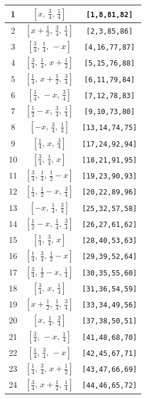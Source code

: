 \documentclass[fleqn,8pt]{jsarticle}
\begin{document}
\begin{longtable}{ccc}
1 & $\left[ x,\, \frac{3}{4},\, \frac{1}{4} \right]$ & {\tt [1,8,81,82]} \\ \hline
2 & $\left[ x + \frac{1}{2},\, \frac{3}{4},\, \frac{1}{4} \right]$ & {\tt [2,3,85,86]} \\ \hline
3 & $\left[ \frac{3}{4},\, \frac{1}{4},\, - x \right]$ & {\tt [4,16,77,87]} \\ \hline
4 & $\left[ \frac{3}{4},\, \frac{1}{4},\, x + \frac{1}{2} \right]$ & {\tt [5,15,76,88]} \\ \hline
5 & $\left[ \frac{1}{4},\, x + \frac{1}{2},\, \frac{3}{4} \right]$ & {\tt [6,11,79,84]} \\ \hline
6 & $\left[ \frac{1}{4},\, - x,\, \frac{3}{4} \right]$ & {\tt [7,12,78,83]} \\ \hline
7 & $\left[ \frac{1}{2} - x,\, \frac{3}{4},\, \frac{1}{4} \right]$ & {\tt [9,10,73,80]} \\ \hline
8 & $\left[ - x,\, \frac{3}{4},\, \frac{1}{4} \right]$ & {\tt [13,14,74,75]} \\ \hline
9 & $\left[ \frac{1}{4},\, x,\, \frac{3}{4} \right]$ & {\tt [17,24,92,94]} \\ \hline
10 & $\left[ \frac{3}{4},\, \frac{1}{4},\, x \right]$ & {\tt [18,21,91,95]} \\ \hline
11 & $\left[ \frac{3}{4},\, \frac{1}{4},\, \frac{1}{2} - x \right]$ & {\tt [19,23,90,93]} \\ \hline
12 & $\left[ \frac{1}{4},\, \frac{1}{2} - x,\, \frac{3}{4} \right]$ & {\tt [20,22,89,96]} \\ \hline
13 & $\left[ - x,\, \frac{1}{4},\, \frac{3}{4} \right]$ & {\tt [25,32,57,58]} \\ \hline
14 & $\left[ \frac{1}{2} - x,\, \frac{1}{4},\, \frac{3}{4} \right]$ & {\tt [26,27,61,62]} \\ \hline
15 & $\left[ \frac{1}{4},\, \frac{3}{4},\, x \right]$ & {\tt [28,40,53,63]} \\ \hline
16 & $\left[ \frac{1}{4},\, \frac{3}{4},\, \frac{1}{2} - x \right]$ & {\tt [29,39,52,64]} \\ \hline
17 & $\left[ \frac{3}{4},\, \frac{1}{2} - x,\, \frac{1}{4} \right]$ & {\tt [30,35,55,60]} \\ \hline
18 & $\left[ \frac{3}{4},\, x,\, \frac{1}{4} \right]$ & {\tt [31,36,54,59]} \\ \hline
19 & $\left[ x + \frac{1}{2},\, \frac{1}{4},\, \frac{3}{4} \right]$ & {\tt [33,34,49,56]} \\ \hline
20 & $\left[ x,\, \frac{1}{4},\, \frac{3}{4} \right]$ & {\tt [37,38,50,51]} \\ \hline
21 & $\left[ \frac{3}{4},\, - x,\, \frac{1}{4} \right]$ & {\tt [41,48,68,70]} \\ \hline
22 & $\left[ \frac{1}{4},\, \frac{3}{4},\, - x \right]$ & {\tt [42,45,67,71]} \\ \hline
23 & $\left[ \frac{1}{4},\, \frac{3}{4},\, x + \frac{1}{2} \right]$ & {\tt [43,47,66,69]} \\ \hline
24 & $\left[ \frac{3}{4},\, x + \frac{1}{2},\, \frac{1}{4} \right]$ & {\tt [44,46,65,72]} \\
\end{longtable}
\end{document}
